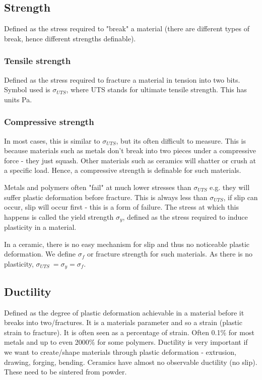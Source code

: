\documentclass[class=report, crop=false, 12pt,a4paper]{standalone}
\begin{document}
\subsection{Strength}
Defined as the stress required to "break" a material (there are different types of break, hence different strengths definable). 
\subsubsection{Tensile strength}
Defined as the stress required to fracture a material in tension into two bits. Symbol used is \(\sigma_{UTS}\), where UTS stands for ultimate tensile strength. This has units \si{\pascal}.
\subsubsection{Compressive strength}
In most cases, this is similar to \(\sigma_{UTS}\), but its often difficult to measure. This is because materials such as metals don't break into two pieces under a compressive force - they just squash. Other materials such as ceramics will shatter or crush at a specific load. Hence, a compressive strength is definable for such materials.

Metals and polymers often "fail" at much lower stresses than \(\sigma_{UTS}\) e.g. they will suffer plastic deformation before fracture. This is always less than \(\sigma_{UTS}\), if slip can occur, slip will occur first - this is a form of failure. The stress at which this happens is called the yield strength \(\sigma_y\), defined as the stress required to induce plasticity in a material. 

In a ceramic, there is no easy mechanism for slip and thus no noticeable plastic deformation. We define \(\sigma_f\) or fracture strength for such materials. As there is no plasticity, \(\sigma_{UTS}\ = \sigma_y = \sigma_f\).
\subsection{Ductility}
Defined as the degree of plastic deformation achievable in a material before it breaks into two/fractures. It is a materials parameter and so a strain (plastic strain to fracture). It is often seen as a percentage of strain. Often 0.1\% for most metals and up to even 2000\% for some polymers. Ductility is very important if we want to create/shape materials through plastic deformation - extrusion, drawing, forging, bending. Ceramics have almost no observable ductility (no slip). These need to be sintered from powder.
\end{document}
